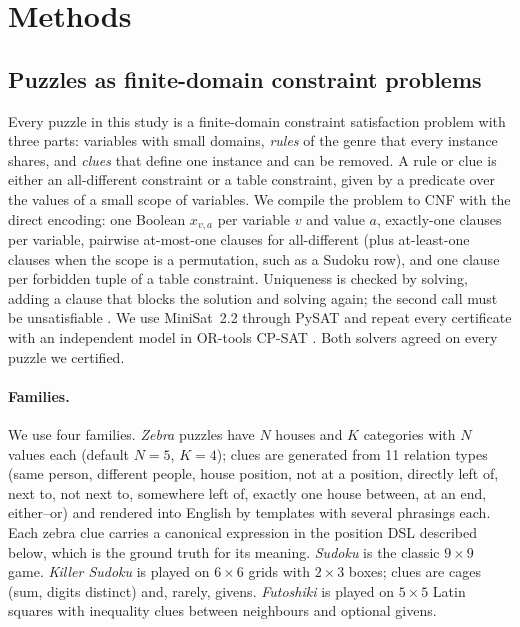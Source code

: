 \section{Methods}
\label{sec:methods}

\subsection{Puzzles as finite-domain constraint problems}

Every puzzle in this study is a finite-domain constraint satisfaction problem with three parts: variables with small domains, \emph{rules} of the genre that every instance shares, and \emph{clues} that define one instance and can be removed. A rule or clue is either an all-different constraint or a table constraint, given by a predicate over the values of a small scope of variables. We compile the problem to CNF with the direct encoding: one Boolean $x_{v,a}$ per variable $v$ and value $a$, exactly-one clauses per variable, pairwise at-most-one clauses for all-different (plus at-least-one clauses when the scope is a permutation, such as a Sudoku row), and one clause per forbidden tuple of a table constraint. Uniqueness is checked by solving, adding a clause that blocks the solution and solving again; the second call must be unsatisfiable \citep{yato2003complexity,lynce2006sudoku}. We use MiniSat~2.2 through PySAT \citep{een2003minisat,ignatiev2018pysat} and repeat every certificate with an independent model in OR-tools CP-SAT \citep{ortools}. Both solvers agreed on every puzzle we certified.

\paragraph{Families.} We use four families. \emph{Zebra} puzzles have $N$ houses and $K$ categories with $N$ values each (default $N{=}5$, $K{=}4$); clues are generated from 11 relation types (same person, different people, house position, not at a position, directly left of, next to, not next to, somewhere left of, exactly one house between, at an end, either--or) and rendered into English by templates with several phrasings each. Each zebra clue carries a canonical expression in the position DSL described below, which is the ground truth for its meaning. \emph{Sudoku} is the classic $9{\times}9$ game. \emph{Killer Sudoku} is played on $6{\times}6$ grids with $2{\times}3$ boxes; clues are cages (sum, digits distinct) and, rarely, givens. \emph{Futoshiki} is played on $5{\times}5$ Latin squares with inequality clues between neighbours and optional givens.

